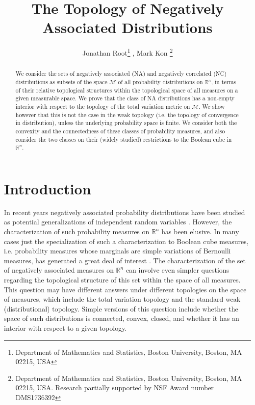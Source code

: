\documentclass[11pt]{article}
\title{The Topology of Negatively Associated Distributions}
\author{Jonathan Root\footnote{ Department of Mathematics and Statistics, Boston University, Boston, MA 02215, USA}
, Mark Kon \footnote{ Department of Mathematics and Statistics, Boston University, Boston, MA 02215, USA. 
Research partially supported by NSF Award number DMS1736392}}
\date{}
\newcommand{\R}{\mathbb{R}}
\begin{document}
\maketitle

\begin{abstract}

We consider the sets of negatively associated (NA) and negatively correlated (NC) distributions as subsets of the
space $\mathcal{M}$ of all probability distributions on $\R^n$, in terms of their relative topological structures within the topological space of all measures on a given measurable space. We prove
that the class of NA distributions has a non-empty interior with respect to the topology of the total variation metric on $\mathcal{M}$.
We show however that this is not the case in the weak topology (i.e. the topology of convergence in distribution),
unless the underlying probability space is finite. We consider both the convexity and the connectedness of these classes of probability measures, and also consider the two classes on their (widely studied) restrictions to the Boolean cube in $\R^n$.
\end{abstract}


\section{Introduction}\label{sec:intro}

In recent years negatively associated probability distributions have been studied as potential generalizations of independent random variables \cite{NA,balls}.  However, the characterization of such probability measures on $\R^n$ has been elusive.  In many cases just the specialization of such a characterization to Boolean cube measures, i.e. probability measures whose marginals are simple variations of Bernoulli measures, has generated a great deal of interest \cite{pemantle,
ndgeometry}.  The characterization of the set of negatively associated measures on $\R^n$ can involve even simpler questions regarding the topological structure of this set within the space of all measures.  This question may have different answers under different topologies on the space of measures, which include the total variation topology and the standard weak (distributional) topology.  Simple versions of this question include whether the space of such distributions is connected, convex, closed, and whether it has an interior with respect to a given topology.

\end{document}
